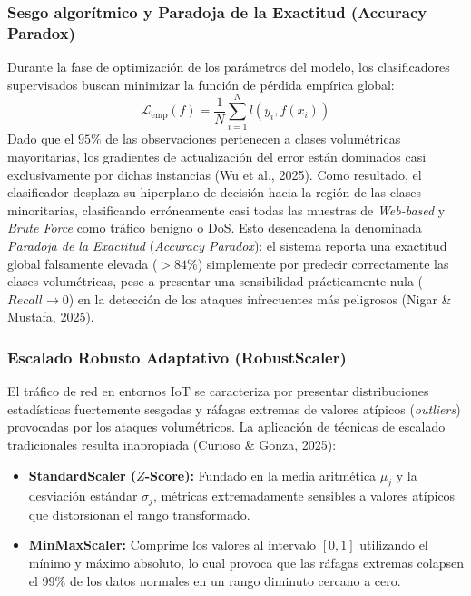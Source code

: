 \subsubsection{Sesgo algorítmico y Paradoja de la Exactitud (Accuracy Paradox)}
Durante la fase de optimización de los parámetros del modelo, los clasificadores supervisados buscan minimizar la función de pérdida empírica global:
\begin{equation}
\mathcal{L}_{\mathrm{emp}}(f) = \frac{1}{N} \sum_{i=1}^N l(y_i, f(x_i))
\end{equation}
Dado que el $95\%$ de las observaciones pertenecen a clases volumétricas mayoritarias, los gradientes de actualización del error están dominados casi exclusivamente por dichas instancias (Wu et al., 2025). Como resultado, el clasificador desplaza su hiperplano de decisión hacia la región de las clases minoritarias, clasificando erróneamente casi todas las muestras de \textit{Web-based} y \textit{Brute Force} como tráfico benigno o DoS. Esto desencadena la denominada \textit{Paradoja de la Exactitud} (\textit{Accuracy Paradox}): el sistema reporta una exactitud global falsamente elevada ($>84\%$) simplemente por predecir correctamente las clases volumétricas, pese a presentar una sensibilidad prácticamente nula ($Recall \to 0$) en la detección de los ataques infrecuentes más peligrosos (Nigar \& Mustafa, 2025).

\subsubsection{Escalado Robusto Adaptativo (RobustScaler)}
El tráfico de red en entornos IoT se caracteriza por presentar distribuciones estadísticas fuertemente sesgadas y ráfagas extremas de valores atípicos (\textit{outliers}) provocadas por los ataques volumétricos. La aplicación de técnicas de escalado tradicionales resulta inapropiada (Curioso \& Gonza, 2025):
\begin{itemize}
    \item \textbf{StandardScaler ($Z$-Score):} Fundado en la media aritmética $\mu_j$ y la desviación estándar $\sigma_j$, métricas extremadamente sensibles a valores atípicos que distorsionan el rango transformado.
    \item \textbf{MinMaxScaler:} Comprime los valores al intervalo $[0, 1]$ utilizando el mínimo y máximo absoluto, lo cual provoca que las ráfagas extremas colapsen el 99\% de los datos normales en un rango diminuto cercano a cero.
\end{itemize}

